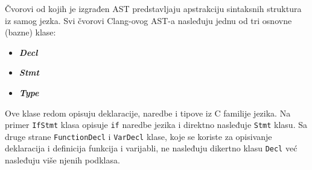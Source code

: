\documentclass[12pt,oneside]{memoir}
\begin{document}
\v{C}vorovi od kojih je izgrađen AST predstavljaju apstrakciju sintaksnih struktura iz samog jezka.
Svi \v{c}vorovi Clang-ovog AST-a nasleđuju jednu od tri osnovne (bazne) klase:
\begin{itemize}
  \item \textit{\textbf{Decl}}
  \item \textit{\textbf{Stmt}}
  \item \textit{\textbf{Type}}
\end{itemize}
Ove klase redom opisuju deklaracije, naredbe i tipove iz C familije jezika.
Na primer \lstinline{IfStmt} klasa opisuje \lstinline{if} naredbe jezika i direktno nasleđuje \lstinline{Stmt} klasu. Sa druge strane \lstinline{FunctionDecl} i \lstinline{VarDecl} klase, koje se koriste za opisivanje deklaracija i definicija funkcija i varijabli, ne nasleđuju dikertno klasu \lstinline{Decl} ve\'{c} nasleđuju vi\v{s}e njenih podklasa.
\end{document}
